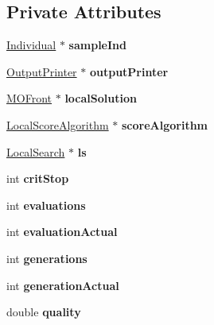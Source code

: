 \subsection*{Private Attributes}
\begin{DoxyCompactItemize}
\item 
\mbox{\label{classEA_aee2992080a3ffc95c9edea9cc142f62d}} 
\mbox{\hyperlink{classIndividual}{Individual}} $\ast$ {\bfseries sample\+Ind}
\item 
\mbox{\label{classEA_a003551d80fd0fd6e7bc29870ec1b2bd8}} 
\mbox{\hyperlink{classOutputPrinter}{Output\+Printer}} $\ast$ {\bfseries output\+Printer}
\item 
\mbox{\label{classEA_a340f68daee20bce5089deed405edb791}} 
\mbox{\hyperlink{classMOFront}{M\+O\+Front}} $\ast$ {\bfseries local\+Solution}
\item 
\mbox{\label{classEA_ad4c30ccbc633bfa530fa50ca0970bd18}} 
\mbox{\hyperlink{classLocalScoreAlgorithm}{Local\+Score\+Algorithm}} $\ast$ {\bfseries score\+Algorithm}
\item 
\mbox{\label{classEA_aeba2a26cf290afd924fbafbd0c4ad64d}} 
\mbox{\hyperlink{classLocalSearch}{Local\+Search}} $\ast$ {\bfseries ls}
\item 
\mbox{\label{classEA_a3acbcb04351627ec86125084c251e12d}} 
int {\bfseries crit\+Stop}
\item 
\mbox{\label{classEA_ad7cefa1c91b348cf8436f49ae83560d6}} 
int {\bfseries evaluations}
\item 
\mbox{\label{classEA_ad612447f4ae22f8c1b651c7d18471846}} 
int {\bfseries evaluation\+Actual}
\item 
\mbox{\label{classEA_ac5a4cf8f9e12dfc07f8d4d4019e89540}} 
int {\bfseries generations}
\item 
\mbox{\label{classEA_a7c2e3fae5ef87767765d58d9637e0d29}} 
int {\bfseries generation\+Actual}
\item 
\mbox{\label{classEA_ad62e844dcae9b5c7724ab56a9aea2dc9}} 
double {\bfseries quality}

\end{DoxyCompactItemize}
